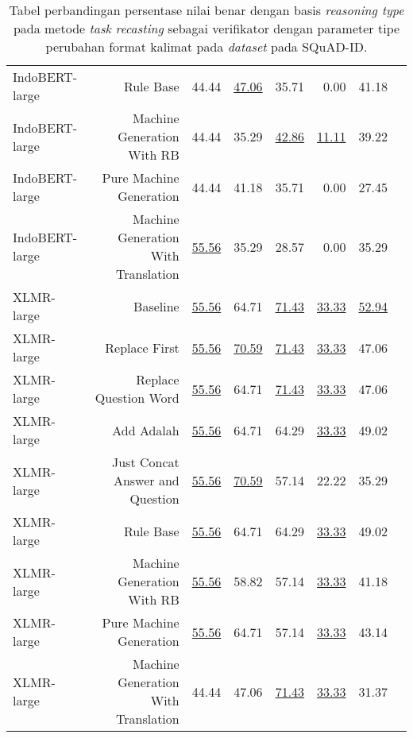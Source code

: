 \begin{table}[H]
\begin{tabular}{lrrrrrrr}
IndoBERT-large &Rule Base &44.44 &\underline{47.06} &35.71 &0.00 &41.18 \\
IndoBERT-large &Machine Generation With RB &44.44 &35.29 &\underline{42.86} &\underline{11.11} &39.22 \\
IndoBERT-large &Pure Machine Generation &44.44 &41.18 &35.71 &0.00 &27.45 \\
IndoBERT-large &Machine Generation With Translation &\underline{55.56} &35.29 &28.57 &0.00 &35.29 \\
\hline
XLMR-large &Baseline &\underline{55.56} &64.71 &\underline{71.43} &\underline{33.33} &\underline{52.94} \\
XLMR-large &Replace First &\underline{55.56} &\underline{70.59} &\underline{71.43} &\underline{33.33} &47.06 \\
XLMR-large &Replace Question Word &\underline{55.56} &64.71 &\underline{71.43} &\underline{33.33} &47.06 \\
XLMR-large &Add Adalah &\underline{55.56} &64.71 &64.29 &\underline{33.33} &49.02 \\
XLMR-large &Just Concat Answer and Question &\underline{55.56} &\underline{70.59} &57.14 &22.22 &35.29 \\
XLMR-large &Rule Base &\underline{55.56} &64.71 &64.29 &\underline{33.33} &49.02 \\
XLMR-large &Machine Generation With RB &\underline{55.56} &58.82 &57.14 &\underline{33.33} &41.18 \\
XLMR-large &Pure Machine Generation &\underline{55.56} &64.71 &57.14 &\underline{33.33} &43.14 \\
XLMR-large &Machine Generation With Translation &44.44 &47.06 &\underline{71.43} &\underline{33.33} &31.37 \\
\bottomrule
\end{tabular}
\caption{Tabel perbandingan persentase nilai benar dengan basis \emph{reasoning type} pada metode \emph{task recasting} sebagai verifikator dengan parameter tipe perubahan format kalimat pada \emph{dataset} pada SQuAD-ID.}
\end{table}

